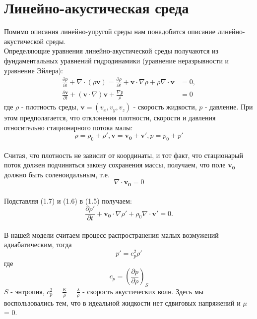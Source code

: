 \documentclass[12pt,a4paper, titlepage, openany]{book}
\begin{document}
\section*{Линейно-акустическая среда}
Помимо описания линейно-упругой среды нам понадобится описание линейно-акустической среды.
\\
Определяющие уравнения линейно-акустической среды получаются из фундаментальных уравнений гидродинамики (уравнение неразрывности и уравнение Эйлера):
\begin{equation}
\begin{aligned}
\frac{\partial \rho}{\partial t} + \nabla \cdot (\rho \mathbf{v}) = \frac{\partial \rho}{\partial t} + \mathbf{v} \cdot \nabla \rho + \rho \nabla \cdot \mathbf{v} &= 0, \\
\frac{\partial \mathbf{v}}{\partial t} + (\mathbf{v} \cdot \nabla) \mathbf{v} + \frac{\nabla p}{\rho} &= 0
\end{aligned}
\end{equation}
где $\rho$ - плотность среды, $\mathbf{v} = (v_x, v_y, v_z)$ - скорость жидкости, $p$ - давление. При этом предполагается, что отклонения плотности, скорости и давления относительно стационарного потока малы:
\begin{equation}
\rho = \rho_0 + \rho', \mathbf{v} = \mathbf{v_0} + \mathbf{v'}, p = p_0 + p'
\end{equation}
\\
Считая, что плотность не зависит от координаты, и тот факт, что стационарый поток должен подчиняться закону сохранения массы, получаем, что поле $\mathbf{v_0}$ должно быть соленоидальным, т.е.
\begin{equation}
\nabla \cdot \mathbf{v_0} = 0
\end{equation}
\\
Подставляя (1.7) и (1.6) в (1.5) получаем:
\begin{equation}
\frac{\partial \rho '}{\partial t} + \mathbf{v_0} \cdot \nabla \rho' + \rho_0 \nabla \cdot \mathbf{v'} = 0.
\end{equation}
\\
В нашей модели считаем процесс распространения малых возмужений адиабатическим, тогда 
\begin{equation}
p' = c^2_p \rho' 
\end{equation}
где
\begin{equation}
c_p = (\frac{\partial p}{\partial \rho})_S
\end{equation}
$S$ - энтропия, $c^2_p = \frac{K}{\rho} = \frac{\lambda}{\rho}$ - скорость акустических волн. Здесь мы воспользовались тем, что в идеальной жидкости нет сдвиговых напряжений и $\mu$ = 0.
\end{document}
